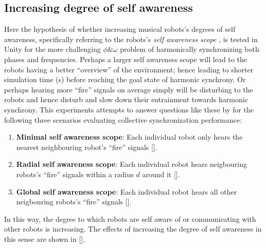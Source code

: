	
	\subsection{Increasing degree of self awareness}
	
	Here the hypothesis of whether increasing musical robots's degrees of self awareness, specifically referring to the robots's \textit{self awareness scope} \cite{sacs17_ch3}, is tested in Unity for the more challenging $\phi \& \omega$ problem of harmonically synchronizing both phases and frequencies. Perhaps a larger self awareness scope will lead to the robots having a better ``overview'' of the environment; hence leading to shorter simulation time (s) before reaching the goal state of harmonic synchrony. Or perhaps hearing more ``fire'' signals on average simply will be disturbing to the robots and hence disturb and slow down their entrainment towards harmonic synchrony. This experiments attempts to answer questions like these by for the following three scenarios evaluating collective synchronization performance:
	
	\begin{enumerate}
		\item \textbf{Minimal self awareness scope}: Each individual robot only hears the nearest neighbouring robot's ``fire'' signals [].
		\item \textbf{Radial self awareness scope}: Each individual robot hears neigbouring robots's ``fire'' signals within a radius $d$ around it [].
		\item \textbf{Global self awareness scope}: Each individual robot hears all other neigbouring robots's ``fire'' signals [].
	\end{enumerate}
	
	In this way, the degree to which robots are self aware of or communicating with other robots is increasing. The effects of increasing the degree of self awareness in this sense are shown in [].
	
	
